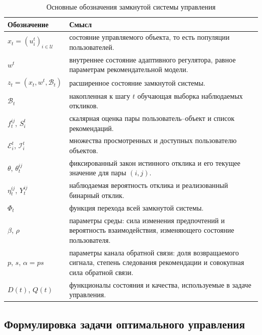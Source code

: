 \begin{table}[H]
    \caption{Основные обозначения замкнутой системы управления}
    \label{tab:control_notation}
    \centering
    \begin{tabularx}{\textwidth}{>{\raggedright\arraybackslash}p{}X}
        \toprule
        Обозначение & Смысл \\
        \midrule
        $x_t=(u_i^t)_{i\in\mathcal U}$ &
        состояние управляемого объекта, то есть популяции пользователей. \\
        $w^t$ &
        внутреннее состояние адаптивного регулятора, равное параметрам рекомендательной модели. \\
        $z_t=(x_t,w^t,\mathcal B_t)$ &
        расширенное состояние замкнутой системы. \\
        $\mathcal B_t$ &
        накопленная к шагу $t$ обучающая выборка наблюдаемых откликов. \\
        $f_t^{ij}$, $S_i^t$ &
        скалярная оценка пары пользователь--объект и список рекомендаций. \\
        $\mathcal E_i^t$, $\mathcal I_i^t$ &
        множества просмотренных и доступных пользователю объектов. \\
        $\theta$, $\theta_t^{ij}$ &
        фиксированный закон истинного отклика и его текущее значение для пары $(i,j)$. \\
        $\eta_t^{ij}$, $Y_t^{ij}$ &
        наблюдаемая вероятность отклика и реализованный бинарный отклик. \\
        $\Phi_t$ &
        функция перехода всей замкнутой системы. \\
        $\beta$, $\rho$ &
        параметры среды: сила изменения предпочтений и вероятность взаимодействия, изменяющего состояние пользователя. \\
        $p$, $s$, $\alpha=ps$ &
        параметры канала обратной связи: доля возвращаемого сигнала, степень следования рекомендации и совокупная сила обратной связи. \\
        $D(t)$, $Q(t)$ &
        функционалы состояния и качества, используемые в задаче управления. \\
        \bottomrule
    \end{tabularx}
\end{table}

\subsection{Формулировка задачи оптимального управления}
\label{subsec:criteria}

